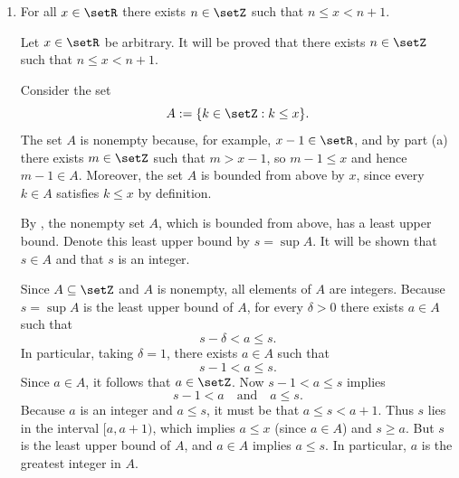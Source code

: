 \begin{enumerate}
\begin{enumerate}[label=(\alph*)]
\begin{subprove}
        Since \(\varepsilon > 0\), the real number \(\frac{1}{\varepsilon}\) is well-defined and positive.
        By part (a), applied to the real number \(x = \frac{1}{\varepsilon}\), there exists an integer \(m \in \setZ\) such that
        \[
          m > \frac{1}{\varepsilon}.
        \]
        Since \(\frac{1}{\varepsilon} > 0\) and \(m > \frac{1}{\varepsilon}\), it follows that \(m > 0\).
        Therefore, \(m \in \setN\).
        Let \(n = m\). Then \(n \in \setN\) and \(n > \frac{1}{\varepsilon} > 0\).
        
        Since \(n > \frac{1}{\varepsilon} > 0\), the inequality may be inverted, giving
        \[
          0 < \frac{1}{n} < \varepsilon.
        \]
        Therefore, there exists \(n \in \setN\) such that \(\frac{1}{n} < \varepsilon\).
      \end{subprove}
      \item For all \(x\in\setR\) there exists \(n\in\setZ\) such that \(n\le x<n+1\).
      \begin{subprove}
        Let \(x \in \setR\) be arbitrary.
        It will be proved that there exists \(n \in \setZ\) such that \(n \le x < n + 1\).
        
        Consider the set
        \[
          A := \{ k \in \setZ : k \le x \}.
        \]
        The set \(A\) is nonempty because, for example, \(x - 1 \in \setR\), and by part (a) there exists \(m \in \setZ\) 
        such that \(m > x - 1\), so \(m - 1 \le x\) and hence \(m - 1 \in A\).
        Moreover, the set \(A\) is bounded from above by \(x\), since every \(k \in A\) satisfies \(k \le x\) by definition.
        
        By , the nonempty set \(A\), which is bounded from above, has a least upper bound.
        Denote this least upper bound by \(s = \sup A\).
        It will be shown that \(s \in A\) and that \(s\) is an integer.
        
        Since \(A \subseteq \setZ\) and \(A\) is nonempty, all elements of \(A\) are integers.
        Because \(s = \sup A\) is the least upper bound of \(A\), for every \(\delta > 0\) there exists \(a \in A\) such that
        \[
          s - \delta < a \le s.
        \]
        In particular, taking \(\delta = 1\), there exists \(a \in A\) such that
        \[
          s - 1 < a \le s.
        \]
        Since \(a \in A\), it follows that \(a \in \setZ\).
        Now \(s - 1 < a \le s\) implies
        \[
          s - 1 < a \quad\text{and}\quad a \le s.
        \]
        Because \(a\) is an integer and \(a \le s\), it must be that \(a \le s < a + 1\).
        Thus \(s\) lies in the interval \([a, a+1)\), which implies \(a \le x\) (since \(a \in A\)) and \(s \ge a\).
        But \(s\) is the least upper bound of \(A\), and \(a \in A\) implies \(a \le s\).
        In particular, \(a\) is the greatest integer in \(A\).
        

\end{subprove}
\end{enumerate}
\end{enumerate}
